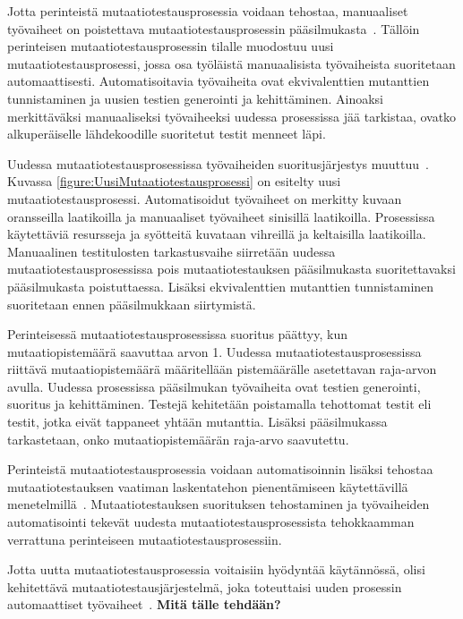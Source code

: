\documentclass[finnish, grading]{tktltiki2}
\theoremstyle{definition}
\theoremstyle{remark}
\begin{document}
Jotta perinteistä mutaatiotestausprosessia voidaan tehostaa, manuaaliset työvaiheet on poistettava mutaatiotestausprosessin pääsilmukasta~\cite[s. 41]{Offutt:Untch:2001}. Tällöin perinteisen mutaatiotestausprosessin tilalle muodostuu uusi mutaatiotestausprosessi, jossa osa työläistä manuaalisista työvaiheista suoritetaan automaattisesti. Automatisoitavia työvaiheita ovat ekvivalenttien mutanttien tunnistaminen ja uusien testien generointi ja kehittäminen. Ainoaksi merkittäväksi manuaaliseksi työvaiheeksi uudessa prosessissa jää tarkistaa, ovatko alkuperäiselle lähdekoodille suoritetut testit menneet läpi.

Uudessa mutaatiotestausprosessissa työvaiheiden suoritusjärjestys muuttuu~\cite[s. 40]{Offutt:Untch:2001}. Kuvassa \ref{figure:UusiMutaatiotestausprosessi} on esitelty uusi mutaatiotestausprosessi. Automatisoidut työvaiheet on merkitty kuvaan oransseilla laatikoilla ja manuaaliset työvaiheet sinisillä laatikoilla. Prosessissa käytettäviä resursseja ja syötteitä kuvataan vihreillä ja keltaisilla laatikoilla. Manuaalinen testitulosten tarkastusvaihe siirretään uudessa mutaatiotestausprosessissa pois mutaatiotestauksen pääsilmukasta suoritettavaksi pääsilmukasta poistuttaessa. Lisäksi ekvivalenttien mutanttien tunnistaminen suoritetaan ennen pääsilmukkaan siirtymistä. 

Perinteisessä mutaatiotestausprosessissa suoritus päättyy, kun mutaatiopistemäärä saavuttaa arvon 1. Uudessa mutaatiotestausprosessissa riittävä mutaatiopistemäärä määritellään pistemäärälle asetettavan raja-arvon avulla. Uudessa prosessissa pääsilmukan työvaiheita ovat testien generointi, suoritus ja kehittäminen. Testejä kehitetään poistamalla tehottomat testit eli testit, jotka eivät tappaneet yhtään mutanttia. Lisäksi pääsilmukassa tarkastetaan, onko mutaatiopistemäärän raja-arvo saavutettu. 

Perinteistä mutaatiotestausprosessia voidaan automatisoinnin lisäksi tehostaa mutaatiotestauksen vaatiman laskentatehon pienentämiseen käytettävillä menetelmillä~\cite[s. 41]{Offutt:Untch:2001}. Mutaatiotestauksen suorituksen tehostaminen ja työvaiheiden automatisointi tekevät uudesta mutaatiotestausprosessista tehokkaamman verrattuna perinteiseen mutaatiotestausprosessiin. 

Jotta uutta mutaatiotestausprosessia voitaisiin hyödyntää käytännössä, olisi kehitettävä mutaatiotestausjärjestelmä, joka toteuttaisi uuden prosessin automaattiset työvaiheet~\cite[s. 41-42]{Offutt:Untch:2001}. \textbf{Mitä tälle tehdään?}
\end{document}
